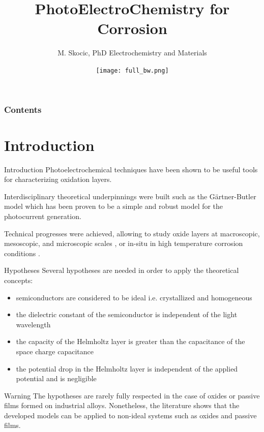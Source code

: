\documentclass[10pt,compress,handout]{beamer}
\title{PhotoElectroChemistry for Corrosion}
\author{M. Skocic, PhD Electrochemistry and Materials}
\date{\vfill \texttt{[image: full\_bw.png]}}
\begin{document}
    \begin{frame}
        \titlepage
    \end{frame}

    \begin{frame}
        \frametitle{Contents}
        \tableofcontents
    \end{frame}


\section{Introduction}
    \begin{frame}{Introduction}
        Photoelectrochemical techniques have been shown to be useful tools for characterizing oxidation layers. 
        
        Interdisciplinary theoretical underpinnings were built \citep{morrison1980, vijh1969, stimming1986, diquarto1997, wouters2007} 
        such as the Gärtner-Butler model \citep{gartner1959,butler1977}
        which has been proven to be a simple and robust model for the photocurrent generation. 
        
        Technical progresses were achieved, allowing to study oxide layers at 
        macroscopic, mesoscopic, and microscopic scales 
        \citep{benaboud2007, srisrual2011}, or in-situ in high temperature corrosion 
        conditions \citep{bojinov2002,skocic2016}.
    \end{frame}

    \begin{frame}{Hypotheses}
        Several hypotheses are needed in order to apply the theoretical concepts:  
        \begin{itemize}
            \item semiconductors are considered to be ideal i.e. crystallized and homogeneous  
            \item the dielectric constant of the semiconductor is independent of the light wavelength  
            \item the capacity of the Helmholtz layer is greater than the capacitance of the space charge capacitance  
            \item the potential drop in the Helmholtz layer is independent of the applied potential and is negligible
        \end{itemize}

        \footnotesize
        \begin{alertblock}{Warning}
            The hypotheses are rarely fully respected in the case of oxides or passive 
            films formed on industrial alloys. Nonetheless, the literature shows that the 
            developed models can be applied to non-ideal systems such as oxides 
            and passive films.
        \end{alertblock}
    \end{frame}
\end{document}
